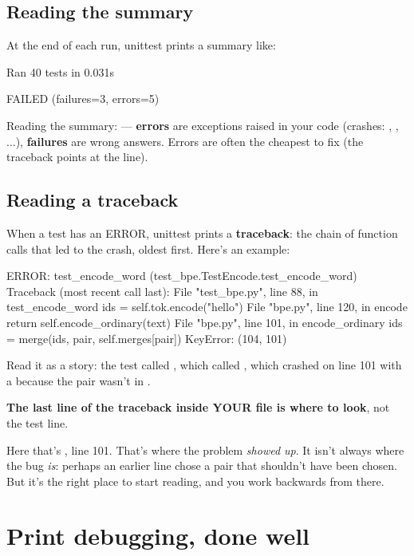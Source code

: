 \documentclass[10pt,a4paper]{article}
\begin{document}
\subsection{Reading the summary}
At the end of each run, unittest prints a summary like:
\begin{txtcode}
Ran 40 tests in 0.031s

FAILED (failures=3, errors=5)
\end{txtcode}
Reading the summary:  — \textbf{errors} are exceptions raised in your code (crashes: , , ...), \textbf{failures} are wrong answers. Errors are often the cheapest to fix (the traceback points at the line).
\subsection{Reading a traceback}
When a test has an ERROR, unittest prints a \textbf{traceback}: the chain of function calls that led to the crash, oldest first. Here’s an example:
\begin{txtcode}
ERROR: test_encode_word (test_bpe.TestEncode.test_encode_word)
Traceback (most recent call last):
  File "test_bpe.py", line 88, in test_encode_word
    ids = self.tok.encode("hello")
  File "bpe.py", line 120, in encode
    return self.encode_ordinary(text)
  File "bpe.py", line 101, in encode_ordinary
    ids = merge(ids, pair, self.merges[pair])
KeyError: (104, 101)
\end{txtcode}
Read it as a story: the test called , which called , which crashed on line 101 with a  because the pair  wasn’t in .
\begin{keybox}
\textbf{The last line of the traceback inside YOUR file is where to look}, not the test line.
\end{keybox}
Here that’s , line 101. That’s where the problem \emph{showed up}. It isn’t always where the bug \emph{is}: perhaps an earlier line chose a pair that shouldn’t have been chosen. But it’s the right place to start reading, and you work backwards from there.
\setcounter{section}{1}
\section{Print debugging, done well}
\end{document}
